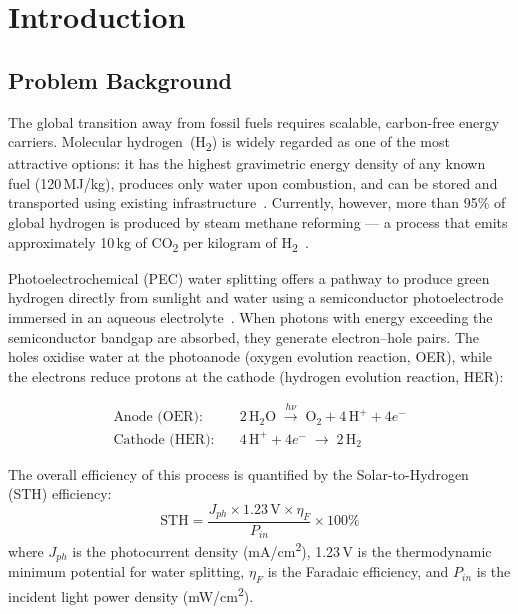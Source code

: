 \chapter{Introduction}\label{ch:intro}

\section{Problem Background}

The global transition away from fossil fuels requires scalable, carbon-free energy
carriers. Molecular hydrogen~(H\textsubscript{2}) is widely regarded as one of the
most attractive options: it has the highest gravimetric energy density of any known
fuel (120\,MJ/kg), produces only water upon combustion, and can be stored and
transported using existing infrastructure~\cite{turner2004sustainable}.
Currently, however, more than 95\% of global hydrogen is produced by steam methane
reforming --- a process that emits approximately 10\,kg of CO\textsubscript{2} per
kilogram of H\textsubscript{2}~\cite{crabtree2004hydrogen}.

Photoelectrochemical (PEC) water splitting offers a pathway to produce green hydrogen
directly from sunlight and water using a semiconductor photoelectrode immersed in an
aqueous electrolyte~\cite{fujishima1972electrochemical}.
When photons with energy exceeding the semiconductor bandgap are absorbed, they
generate electron--hole pairs.
The holes oxidise water at the photoanode (oxygen evolution reaction, OER), while
the electrons reduce protons at the cathode (hydrogen evolution reaction, HER):

\begin{align}
  \text{Anode (OER):}   &\quad 2\,\mathrm{H_2O}
    \;\xrightarrow{h\nu}\;
    \mathrm{O_2} + 4\,\mathrm{H^+} + 4e^- \\
  \text{Cathode (HER):} &\quad 4\,\mathrm{H^+} + 4e^-
    \;\to\; 2\,\mathrm{H_2}
\end{align}

The overall efficiency of this process is quantified by the Solar-to-Hydrogen (STH)
efficiency:
\begin{equation}
  \mathrm{STH} =
    \frac{J_{ph} \times 1.23\,\mathrm{V} \times \eta_F}{P_{in}} \times 100\%
  \label{eq:sth}
\end{equation}
where $J_{ph}$ is the photocurrent density (mA/cm\textsuperscript{2}),
1.23\,V is the thermodynamic minimum potential for water splitting,
$\eta_F$ is the Faradaic efficiency, and
$P_{in}$ is the incident light power density (mW/cm\textsuperscript{2}).

